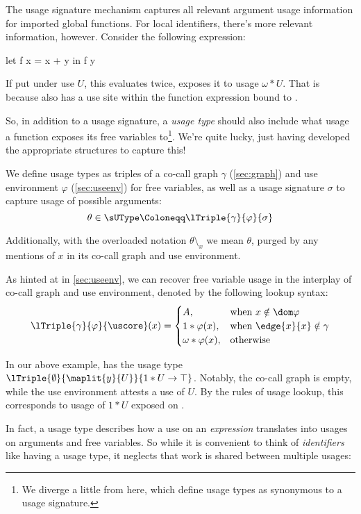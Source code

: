 The usage signature mechanism captures all relevant argument usage information for imported global functions.
For local identifiers, there's more relevant information, however.
Consider the following expression:

\begin{haskellcode}
let f x = x + y
in f y
\end{haskellcode}

If put under use $U$, this evaluates  twice, \eg exposes it to usage $\omega*U$.
That is because  also has a use site within the function expression bound to .

So, in addition to a usage signature, a \emph{usage type} should also include what usage a function exposes its free variables to\footnote{We diverge a little from \textcite{card} here, which define usage types as synonymous to a usage signature.}.
We're quite lucky, just having developed the appropriate structures to capture this!

We define usage types as triples of a co-call graph $\gamma$ (\cref{sec:graph}) and use environment $\varphi$ (\cref{sec:useenv}) for free variables, as well as a usage signature $\sigma$ to capture usage of possible arguments:
\[
\theta \in \sUType \Coloneqq \lTriple{\gamma}{\varphi}{\sigma}
\]

Additionally, with the overloaded notation $\theta \setminus_x$ we mean $\theta$, purged by any mentions of $x$ in its co-call graph and use environment.

As hinted at in \cref{sec:useenv}, we can recover free variable usage in the interplay of co-call graph and use environment, denoted by the following lookup syntax:
\[
\lTriple{\gamma}{\varphi}{\uscore}(x) =
  \begin{cases}
    A, & \text{when } x\notin \dom\varphi \\
    1*\varphi(x), & \text{when } \edge{x}{x} \notin \gamma \\
    \omega*\varphi(x), & \text{otherwise}
  \end{cases}
\]

In our above example,  has the usage type $\lTriple{\emptyset}{\maplit{y}{U}}{1*U \to \top}$.
Notably, the co-call graph is empty, while the use environment attests  a use of $U$.
By the rules of usage lookup, this corresponds to usage of $1*U$ exposed on .

In fact, a usage type describes how a use on an \emph{expression} translates into usages on arguments and free variables.
So while it is convenient to think of \emph{identifiers} like  having a usage type, it neglects that work is shared between multiple usages:

